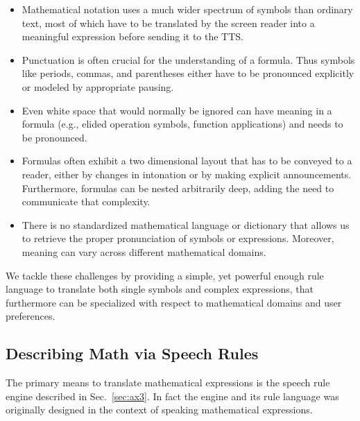 \documentclass{sig-alternate}
\begin{document}
\begin{itemize}\itemsep-1pt
\item Mathematical notation uses a much wider spectrum of symbols than ordinary
  text, most of which have to be translated by the screen reader into a
  meaningful expression before sending it to the TTS.
\item Punctuation is often crucial for the understanding of a formula. Thus
  symbols like periods, commas, and parentheses either have to be pronounced
  explicitly or modeled by appropriate pausing. 
\item Even white space that would normally be ignored can have meaning in a
  formula (e.g., elided operation symbols, function applications) and needs
  to be pronounced.
\item Formulas often exhibit a two dimensional layout that has to be conveyed to
  a reader, either by changes in intonation or by making explicit announcements.
  Furthermore, formulas can be nested arbitrarily deep, adding the need to
  communicate that complexity.
\item There is no standardized mathematical language or dictionary that allows
  us to retrieve the proper pronunciation of symbols or expressions. Moreover,
  meaning can vary across different mathematical domains.
\end{itemize}

We tackle these challenges by providing a simple, yet powerful enough rule
language to translate both single symbols and complex expressions, that
furthermore can be specialized with respect to mathematical domains and user
preferences.

\subsection{Describing Math via Speech Rules}

\newcommand{\srule}[2]{\ensuremath{#1 \rightarrow #2}}
\newcommand{\slist}[1]{\ensuremath{#1}}
\newcommand{\ttrule}[2]{
  
  \noindent\centerline{\texttt{#1}$\rightarrow$\texttt{#2}}}
\newcommand{\tttrule}[2]{

  \noindent
  \texttt{#1}\newline\hspace*{\fill}$\longrightarrow$\texttt{#2}

}
\def\cR{{\cal R}} \def\cN{{\cal N}} \def\assign#1#2{{#1}\leftarrow{#2}} 


The primary means to translate mathematical expressions is the speech rule
engine described in Sec.~\ref{sec:ax3}. In fact the engine and its rule language
was originally designed in the context of speaking mathematical expressions.
\end{document}
